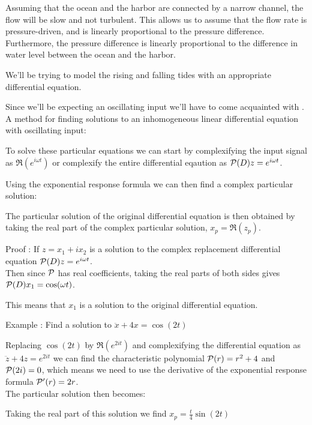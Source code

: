 \documentclass[11pt, openright]{book}
\begin{document}
Assuming that the ocean and the harbor are connected by a narrow channel, the flow will be slow and not turbulent. This allows us to assume that the flow rate is pressure-driven, and is linearly proportional to the pressure difference. Furthermore, the pressure difference is linearly proportional to the difference in water level between the ocean and the harbor.


We'll be trying to model the rising and falling tides with an appropriate differential equation.

Since we'll be expecting an oscillating input we'll have to come acquainted with . A method for finding solutions to an inhomogeneous linear differential equation with oscillating input:

To solve these particular equations we can start by complexifying the input signal as $\Re(e^{i\omega t})$
or complexify the entire differential eqaution as $\P(D)z=e^{i\omega t}$.

Using the exponential response formula we can then find a complex particular solution:

The particular solution of the original differential equation is then obtained by taking the real part of the complex particular solution, $x_p=\Re(z_p)$.

\begin{dent}{Proof :}
    If $z=x_1+ix_2$ is a solution to the complex replacement differential equation $\P(D)z=e^{i\omega t}$.\\
    Then since $\P$ has real coefficients, taking the real parts of both sides gives $\P(D)x_1=\cos(\omega t)$.

    This means that $x_1$ is a solution to the original differential equation.
\end{dent}

\begin{dent}{Example :}
    Find a solution to $\ddot{x}+4x=\cos(2t)$

    Replacing $\cos(2t)$ by $\Re(e^{2it})$ and complexifying the differential equation as $\ddot{z}+4z=e^{2it}$ we can find the characteristic polynomial $\P(r)=r^2+4$ and $\P(2i)=0$, which means we need to use the derivative of the exponential response formula $\P'(r)=2r$.\\
    The particular solution then becomes:

    Taking the real part of this solution we find $x_p=\frac{t}{4}\sin(2t)$

\end{dent}
\end{document}
